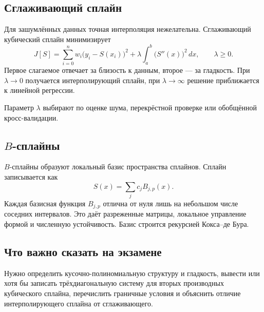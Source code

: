 \subsection{Сглаживающий сплайн}

Для зашумлённых данных точная интерполяция нежелательна. Сглаживающий кубический
сплайн минимизирует
\[
    J[S]=
    \sum_{i=0}^{n}w_i\bigl(y_i-S(x_i)\bigr)^2
    +\lambda\int_a^b\bigl(S''(x)\bigr)^2\,dx,
    \qquad \lambda\geq0.
\]
Первое слагаемое отвечает за близость к данным, второе --- за гладкость.
При $\lambda\to0$ получается интерполирующий сплайн, при
$\lambda\to\infty$ решение приближается к линейной регрессии.

Параметр $\lambda$ выбирают по оценке шума, перекрёстной проверке или обобщённой
кросс-валидации.

\subsection[B-сплайны]{$B$-сплайны}

$B$-сплайны образуют локальный базис пространства сплайнов. Сплайн записывается
как
\[
    S(x)=\sum_j c_jB_{j,p}(x).
\]
Каждая базисная функция $B_{j,p}$ отлична от нуля лишь на небольшом числе
соседних интервалов. Это даёт разреженные матрицы, локальное управление формой и
численную устойчивость. Базис строится рекурсией Кокса--де Бура.

\subsection{Что важно сказать на экзамене}

Нужно определить кусочно-полиномиальную структуру и гладкость, вывести или хотя
бы записать трёхдиагональную систему для вторых производных кубического сплайна,
перечислить граничные условия и объяснить отличие интерполирующего сплайна от
сглаживающего.

\newpage
